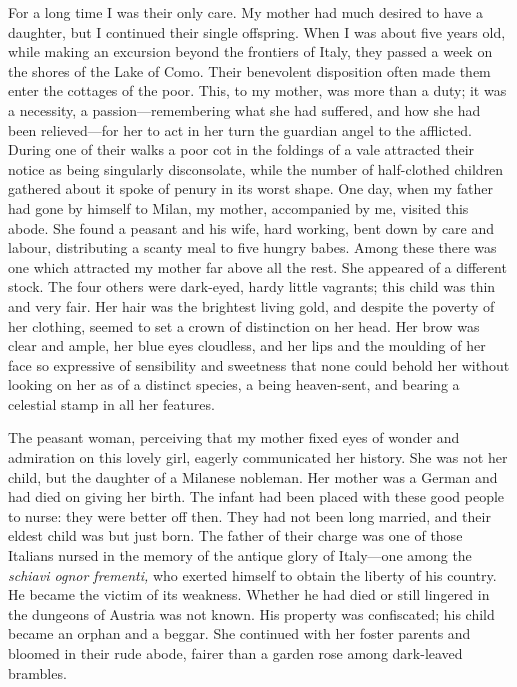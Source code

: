 \documentclass[12pt,openright]{book}
\begin{document}
For a long time I was their only care. My mother had much desired to have a daughter, but I continued their single offspring. When I was about five years old, while making an excursion beyond the frontiers of Italy, they passed a week on the shores of the Lake of Como. Their benevolent disposition often made them enter the cottages of the poor. This, to my mother, was more than a duty; it was a necessity, a passion—remembering what she had suffered, and how she had been relieved—for her to act in her turn the guardian angel to the afflicted. During one of their walks a poor cot in the foldings of a vale attracted their notice as being singularly disconsolate, while the number of half-clothed children gathered about it spoke of penury in its worst shape. One day, when my father had gone by himself to Milan, my mother, accompanied by me, visited this abode. She found a peasant and his wife, hard working, bent down by care and labour, distributing a scanty meal to five hungry babes. Among these there was one which attracted my mother far above all the rest. She appeared of a different stock. The four others were dark-eyed, hardy little vagrants; this child was thin and very fair. Her hair was the brightest living gold, and despite the poverty of her clothing, seemed to set a crown of distinction on her head. Her brow was clear and ample, her blue eyes cloudless, and her lips and the moulding of her face so expressive of sensibility and sweetness that none could behold her without looking on her as of a distinct species, a being heaven-sent, and bearing a celestial stamp in all her features.

The peasant woman, perceiving that my mother fixed eyes of wonder and admiration on this lovely girl, eagerly communicated her history. She was not her child, but the daughter of a Milanese nobleman. Her mother was a German and had died on giving her birth. The infant had been placed with these good people to nurse: they were better off then. They had not been long married, and their eldest child was but just born. The father of their charge was one of those Italians nursed in the memory of the antique glory of Italy—one among the \textit{schiavi ognor frementi,} who exerted himself to obtain the liberty of his country. He became the victim of its weakness. Whether he had died or still lingered in the dungeons of Austria was not known. His property was confiscated; his child became an orphan and a beggar. She continued with her foster parents and bloomed in their rude abode, fairer than a garden rose among dark-leaved brambles.
\end{document}
